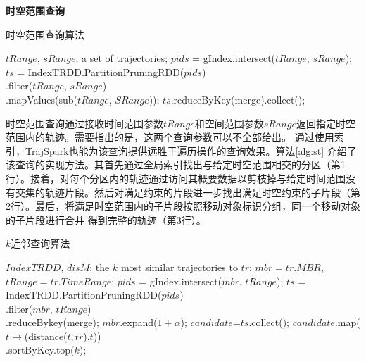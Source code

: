	\textbf{时空范围查询}
	
\begin{algorithm}[h]    %
	\caption{时空范围查询算法}   %
	\label{alg:st}       %
	\begin{algorithmic}[1] 
		\REQUIRE $tRange$, $sRange$;
		\ENSURE a set of trajectories;
		\STATE $pids$ = gIndex.intersect($tRange$, $sRange$);
		\STATE $ts$ = IndexTRDD.PartitionPruningRDD($pids$) \\
		\qquad \qquad \qquad \qquad .filter($tRange$, $sRange$) \\
		\qquad \qquad \qquad \qquad	.mapValues(sub($tRange$, $SRange$));
		\RETURN 	  $ts$.reduceByKey(merge).collect();
	\end{algorithmic}
\end{algorithm}

时空范围查询通过接收时间范围参数$tRange$和空间范围参数$sRange$返回指定时空范围内的轨迹。需要指出的是，这两个查询参数可以不全部给出。
通过使用索引，TrajSpark也能为该查询提供远胜于遍历操作的查询效果。算法\ref{alg:st} 介绍了该查询的实现方法。其首先通过全局索引找出与给定时空范围相交的分区（第1行）。接着，对每个分区内的轨迹通过访问其概要数据以剪枝掉与给定时间范围没有交集的轨迹片段。然后对满足约束的片段进一步找出满足时空约束的子片段（第2行）。最后，将满足时空范围内的子片段按照移动对象标识分组，同一个移动对象的子片段进行合并 得到完整的轨迹（第3行）。

\begin{algorithm}    %
	\setlength{\abovedisplayskip}{8pt}
	\setlength{\belowdisplayskip}{8pt}
	\caption{$k$近邻查询算法}   %
	\label{alg:knn}       %
	\begin{algorithmic}[1] 
		\REQUIRE $IndexTRDD$, $disM$;
		\ENSURE the $k$ most similar trajectories to $tr$;
		\STATE $mbr = tr.MBR$, $tRange=tr.TimeRange$;
		\REPEAT
		\STATE $pids$ = gIndex.intersect($mbr$, $tRange$);
		\STATE $ts$ = IndexTRDD.PartitionPruningRDD($pids$)\\
		\qquad \qquad \qquad \qquad         .filter($mbr$, $tRange$) \\
		\qquad \qquad \qquad \qquad	.reduceBykey(merge);
		\STATE $mbr$.expand($1+\alpha$);
		\STATE $candidate$=$ts$.collect();
		\RETURN $candidate$.map($t\rightarrow $(distance($t,tr$),$t$))\\
		\qquad \qquad \qquad \qquad	.sortByKey.top($k$);
	\end{algorithmic}
\end{algorithm}


